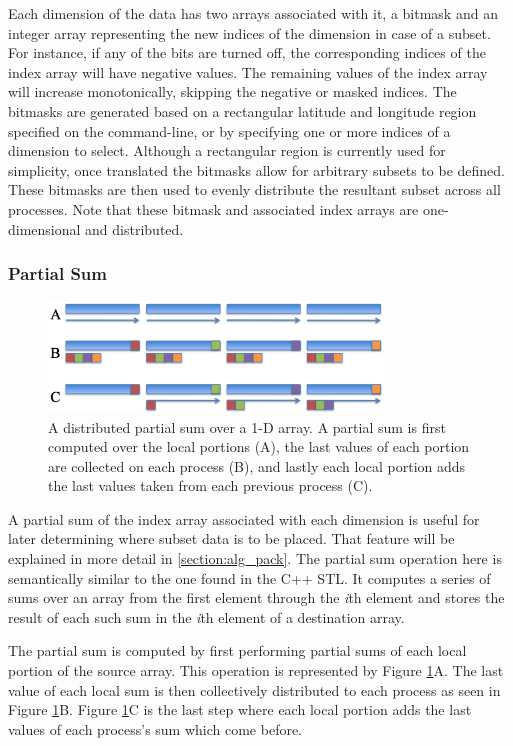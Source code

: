 Each dimension of the data has two arrays associated with it, a bitmask and an
integer array representing the new indices of the dimension in case of a
subset.  For instance, if any of the bits are turned off, the corresponding
indices of the index array will have negative values.  The remaining values of
the index array will increase monotonically, skipping the negative or masked
indices.  The bitmasks are generated based on a rectangular latitude and
longitude region specified on the command-line, or by specifying one or more
indices of a dimension to select.  Although a rectangular region is currently
used for simplicity, once translated the bitmasks allow for arbitrary subsets
to be defined.  These bitmasks are then used to evenly distribute the
resultant subset across all processes.  Note that these bitmask and associated
index arrays are one-dimensional and distributed.

\subsubsection{Partial Sum}

\begin{figure}[!t]
\center
\includegraphics[width=3.5in]{images/partialsum}
\caption{A distributed partial sum over a 1-D array.  A partial sum is first
computed over the local portions (A), the last values of each portion are
collected on each process (B), and lastly each local portion adds the last
values taken from each previous process (C).}
\label{fig:partialsum}
\end{figure}

A partial sum of the index array associated with each dimension is useful for
later determining where subset data is to be placed.  That feature will be
explained in more detail in \ref{section:alg_pack}.  The partial sum operation
here is semantically similar to the one found in the C++ STL\cite{CXXSTL}.  It
computes a series of sums over an array from the first element through the
\emph{i}th element and stores the result of each such sum in the \emph{i}th
element of a destination array.

The partial sum is computed by first performing partial sums of each local
portion of the source array.  This operation is represented by Figure
\ref{fig:partialsum}A.  The last value of each local sum is then collectively
distributed to each process as seen in Figure \ref{fig:partialsum}B.  Figure
\ref{fig:partialsum}C is the last step where each local portion adds the last
values of each process's sum which come before.

